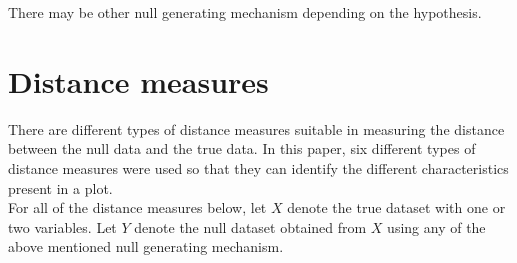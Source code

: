 \documentclass[12]{article}
\newcommand{\blue}[1]{{\color{blue} #1}}
\newcommand{\red}[1]{{\color{red} #1}}
\begin{document}
There may be other null generating mechanism depending on the hypothesis. 

\section{Distance measures} \label{sec:meas}

%
%

%

There are different types of distance measures suitable in measuring the distance between the null data and the true data. In this paper, six different types of distance measures were used so that they can identify the different characteristics present in a plot. \\

For all of the distance measures below, let $X$ denote the true dataset with one or two variables. Let $Y$ denote the null dataset obtained from $X$ using any of the above mentioned null generating mechanism.
\end{document}
